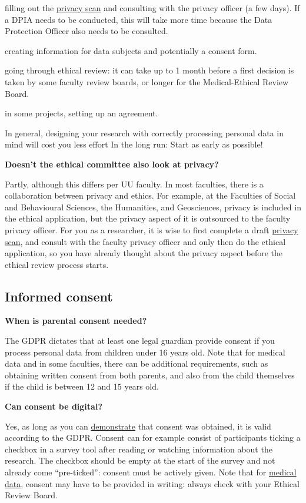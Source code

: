 \documentclass[
]{book}
\begin{document}
filling out the \protect\hyperlink{privacy-scan}{privacy scan} and consulting with the privacy officer (a few days). If a DPIA needs to be conducted, this will take more time because the Data Protection Officer also needs to be consulted.

creating information for data subjects and potentially a consent form.

going through ethical review: it can take up to 1 month before a first decision is taken by some faculty review boards, or longer for the Medical-Ethical Review Board.

in some projects, setting up an agreement.

In general, designing your research with correctly processing personal data in mind will cost you less effort In the long run: Start as early as possible!

\textbf{Doesn't the ethical committee also look at privacy?}

Partly, although this differs per UU faculty. In most faculties, there is a collaboration between privacy and ethics. For example, at the Faculties of Social and Behavioural Sciences, the Humanities, and Geosciences, privacy is included in the ethical application, but the privacy aspect of it is outsourced to the faculty privacy officer. For you as a researcher, it is wise to first complete a draft \protect\hyperlink{privacy-scan}{privacy scan}, and consult with the faculty privacy officer and only then do the ethical application, so you have already thought about the privacy aspect before the ethical review process starts.

\hypertarget{consent}{%
\subsection{Informed consent}\label{consent}}

\textbf{When is parental consent needed?}

The GDPR dictates that at least one legal guardian provide consent if you process personal data from children under 16 years old. Note that for medical data and in some faculties, there can be additional requirements, such as obtaining written consent from both parents, and also from the child themselves if the child is between 12 and 15 years old.

\textbf{Can consent be digital?}

Yes, as long as you can \protect\hyperlink{forms-consent}{demonstrate} that consent was obtained, it is valid according to the GDPR. Consent can for example consist of participants ticking a checkbox in a survey tool after reading or watching information about the research. The checkbox should be empty at the start of the survey and not already come ``pre-ticked'': consent must be actively given. Note that for \href{https://www.ccmo.nl/onderzoekers/wet-en-regelgeving-voor-medisch-wetenschappelijk-onderzoek/de-wmo-in-een-notendop/toestemming/elektronische-toestemming}{medical data}, consent may have to be provided in writing: always check with your Ethical Review Board.
\end{document}
